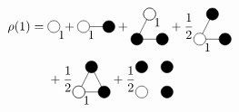\documentclass[8.5pt,twoside,twocolumn]{article}
\theoremstyle{standard}
\begin{document}
\begin{equation}
\begin{aligned}
\rho(1)=
\hskip.1cm &\begin{tikzpicture}[baseline=-.1cm]
  \draw(0,0) node[circle,minimum size=.2cm,draw] (A) {};
  \node [below right] at (A) {1};
\end{tikzpicture}
\hskip-.2cm+
\begin{tikzpicture}[baseline=-.1cm]%
  \draw(0,0) node[circle,minimum size=.2cm,draw] (A) {};
  \draw(.7,0) node[circle,minimum size=.2cm,draw,fill=black] (B) {};
  \draw (A.east) --  (B.center);
  \node [below right] at (A) {1};
\end{tikzpicture}
+
\begin{tikzpicture}[baseline=.25cm]
  \draw(0,0) node[circle,minimum size=.2cm,draw,fill=black] (A) {};
  \draw(.7,0) node[circle,minimum size=.2cm,draw,fill=black] (B) {};
  \draw(.35,.7) node[circle,minimum size=.2cm,draw] (C) {};
  \draw (A.center) --  (B.west);
  \draw (A.center) --  (C.center);
  \draw node[circle,minimum size=.2cm,draw,fill=white,opacity=1] at (C) {};
  \node [below right] at (C) {1};
\end{tikzpicture}
+\frac 1 2
\begin{tikzpicture}[baseline=.25cm]
  \draw(.7,0) node[circle,minimum size=.2cm,draw,fill=black] (B) {};
  \draw(.35,.7) node[circle,minimum size=.2cm,draw,fill=black] (C) {};
  \draw (0,0) --  (B.center);
  \draw (0,0) --  (C.center);
  \draw(0,0) node[circle,minimum size=.2cm,draw,fill=white] (A) {};
  \node [below right] at (A) {1};
\end{tikzpicture}
\\&+ 
\frac 1 2
\begin{tikzpicture}[baseline=.25cm]
  \draw(0,0) node[circle,minimum size=.2cm,draw] (A) {};
  \draw(.7,0) node[circle,minimum size=.2cm,draw,fill=black] (B) {};
  \draw(.35,.7) node[circle,minimum size=.2cm,draw,fill=black] (C) {};
  \draw (A.center) --  (B.center);
  \draw (A.center) --  (C.center);
  \draw (B.center) --  (C.center);
  \draw node[circle,minimum size=.2cm,draw,fill=white,opacity=1] at (A) {};
  \node [below right] at (A) {1};
\end{tikzpicture}
 +
 \frac 1 2 
 \begin{tikzpicture}[baseline=.25cm]
  \draw(0,0) node[circle,minimum size=.2cm,draw] (A) {};
  \draw(.7,0) node[circle,minimum size=.2cm,draw,fill=black] (B) {};
  \draw(0,.7) node[circle,minimum size=.2cm,draw,fill=black] (C) {};
  \draw(.7,.7) node[circle,minimum size=.2cm,draw,fill=black] (D) {};

\end{tikzpicture}
\end{aligned}
\end{equation}
\end{document}
